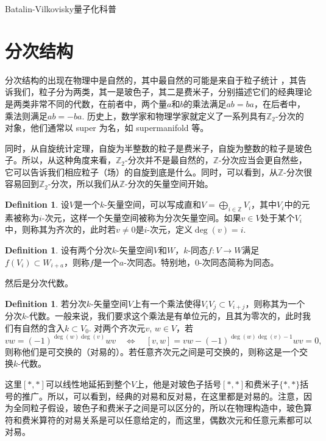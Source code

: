 \documentclass[11pt]{article}
\theoremstyle{definition}
\newtheorem{defi}[para]{Definition}
\theoremstyle{plain}
\begin{document}
Batalin-Vilkovisky量子化科普

\section{分次结构}

分次结构的出现在物理中是自然的，其中最自然的可能是来自于粒子统计%
，其告诉我们，粒子分为两类，其一是玻色子，其二是费米子，分别描述它们的经典理论是两类非常不同的代数，在前者中，两个量$a$和$b$的乘法满足$ab=ba$，在后者中，乘法则满足$ab=-ba$. 历史上，数学家和物理学家就定义了一系列具有$\mathbb{Z}_2$-分次的对象，他们通常以 super 为名，如 supermanifold 等。

同时，从自旋统计定理，自旋为半整数的粒子是费米子，自旋为整数的粒子是玻色子。所以，从这种角度来看，$\mathbb{Z}_2$-分次并不是最自然的，$\mathbb{Z}$-分次应当会更自然些，它可以告诉我们相应粒子（场）的自旋到底是什么。同时，可以看到，从$\mathbb Z$-分次很容易回到$\mathbb Z_2$-分次，所以我们从$\mathbb{Z}$-分次的矢量空间开始。

\begin{defi}
    设$V$是一个$k$-矢量空间，可以写成直和$V=\bigoplus_{i\in\mathbb Z} V_i$，其中$V_i$中的元素被称为$i$-次元，这样一个矢量空间被称为分次矢量空间。如果$v\in V$处于某个$V_i$中，则称其为齐次的，此时若$v\neq 0$是$i$-次元，定义$\deg(v)=i$. 
\end{defi}

\begin{defi}
    设有两个分次$k$-矢量空间$V$和$W$，$k$-同态$f:V\to W$满足$f(V_i)\subset W_{i+a}$，则称$f$是一个$a$-次同态。特别地，$0$-次同态简称为同态。
\end{defi}

然后是分次代数。

\begin{defi}
    若分次$k$-矢量空间$V$上有一个乘法使得$V_iV_j\subset V_{i+j}$，则称其为一个分次$k$-代数。一般来说，我们要求这个乘法是有单位元的，且其为零次的，此时我们有自然的含入$k\subset V_0$. 对两个齐次元$v$, $w\in V$，若
\[
    vw=(-1)^{\deg(w)\deg(v)}wv\quad \Leftrightarrow \quad 
    [v,w]=vw-(-1)^{\deg(w)\deg(v)-1}wv=0,
\]
则称他们是可交换的（对易的）。若任意齐次元之间是可交换的，则称这是一个交换$k$-代数。
\end{defi}

这里$[*,*]$可以线性地延拓到整个$V$上，他是对玻色子括号$[*,*]$和费米子$\{*,*\}$括号的推广。所以，可以看到，经典的对易和反对易，在这里都是对易的。注意，因为全同粒子假设，玻色子和费米子之间是可以区分的，所以在物理构造中，玻色算符和费米算符的对易关系是可以任意给定的，而这里，偶数次元和任意元素都可以对易。
\end{document}
